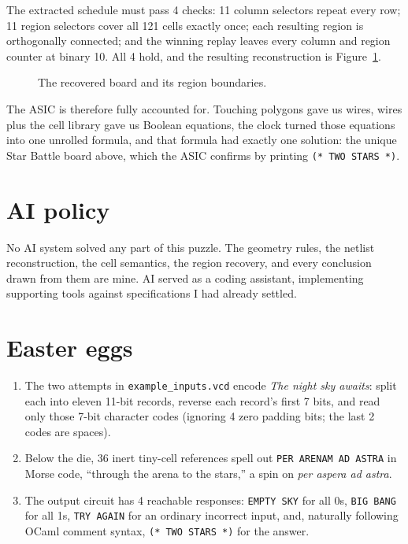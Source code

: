 \documentclass[11pt]{article}
\newcommand{\fitwidth}[1]{\resizebox{\ifdim\width>\linewidth\linewidth\else\width\fi}{!}{#1}}
\begin{document}
The extracted schedule must pass 4 checks: 11 column selectors repeat every row; 11 region selectors cover all 121 cells exactly once; each resulting region is orthogonally connected; and the winning replay leaves every column and region counter at binary 10. All 4 hold, and the resulting reconstruction is Figure~\ref{fig:board}.

\begin{figure}[H]
  \centering
  \fitwidth{}
  \caption{The recovered board and its region boundaries.}
  \label{fig:board}
\end{figure}

The ASIC is therefore fully accounted for. Touching polygons gave us wires, wires plus the cell library gave us Boolean equations, the clock turned those equations into one unrolled formula, and that formula had exactly one solution: the unique Star Battle board above, which the ASIC confirms by printing \texttt{(* TWO STARS *)}.

\section{AI policy}

No AI system solved any part of this puzzle. The geometry rules, the netlist reconstruction, the cell semantics, the region recovery, and every conclusion drawn from them are mine. AI served as a coding assistant, implementing supporting tools against specifications I had already settled.

\section{Easter eggs}

\begin{enumerate}[leftmargin=*]
  \item The two attempts in \texttt{example\_inputs.vcd} encode \emph{The night sky awaits}: split each into eleven 11-bit records, reverse each record's first 7 bits, and read only those 7-bit character codes (ignoring 4 zero padding bits; the last 2 codes are spaces).
  \item Below the die, 36 inert tiny-cell references spell out \texttt{PER ARENAM AD ASTRA} in Morse code, ``through the arena to the stars,'' a spin on \emph{per aspera ad astra}.
  \item The output circuit has 4 reachable responses: \texttt{EMPTY SKY} for all 0s, \texttt{BIG BANG} for all 1s, \texttt{TRY AGAIN} for an ordinary incorrect input, and, naturally following OCaml comment syntax, \texttt{(* TWO STARS *)} for the answer.
\end{enumerate}
\end{document}
